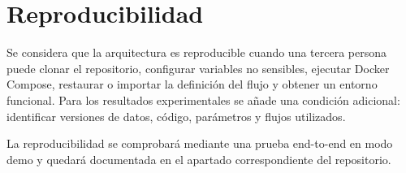 \section{Reproducibilidad}

Se considera que la arquitectura es reproducible cuando una tercera persona puede clonar el repositorio, configurar variables no sensibles, ejecutar Docker Compose, restaurar o importar la definición del flujo y obtener un entorno funcional. Para los resultados experimentales se añade una condición adicional: identificar versiones de datos, código, parámetros y flujos utilizados.

La reproducibilidad se comprobará mediante una prueba end-to-end en modo demo y quedará documentada en el apartado correspondiente del repositorio.
